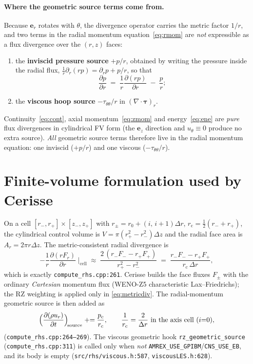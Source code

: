 \documentclass[11pt]{article}
\newcommand{\pd}[2]{\frac{\partial #1}{\partial #2}}
\newcommand{\ur}{u_r}
\newcommand{\rhalf}{r_{\mathrm{c}}}
\newcommand{\code}[1]{\texttt{\small #1}}
\begin{document}
\paragraph{Where the geometric source terms come from.}
Because $\bm e_r$ rotates with $\theta$, the divergence operator carries
the metric factor $1/r$, and two terms in the radial momentum
equation~\eqref{eq:rmom} are \emph{not} expressible as a flux divergence
over the $(r,z)$ faces:
\begin{enumerate}[leftmargin=2.2em,itemsep=2pt]
\item the \textbf{inviscid pressure source} $+p/r$, obtained by writing the
      pressure inside the radial flux,
      $\tfrac1r\partial_r(rp)=\partial_r p + p/r$, so that
      \begin{equation}
      \pd{p}{r} \;=\; \frac1r\pd{(rp)}{r} \;-\; \frac{p}{r};
      \label{eq:psplit}
      \end{equation}
\item the \textbf{viscous hoop source} $-\tau_{\theta\theta}/r$ in
      $(\nabla\cdot\bm\tau)_r$.
\end{enumerate}
Continuity~\eqref{eq:cont}, axial momentum~\eqref{eq:zmom} and
energy~\eqref{eq:ene} are \emph{pure} flux divergences in cylindrical FV
form (the $\bm e_z$ direction and $u_\theta\!\equiv\!0$ produce no extra
source).  \emph{All} geometric source terms therefore live in the radial
momentum equation: one inviscid ($+p/r$) and one viscous
($-\tau_{\theta\theta}/r$).

\section{Finite-volume formulation used by Cerisse}
On a cell $[r_-,r_+]\times[z_-,z_+]$ with $r_\pm=r_0+(i,\,i{+}1)\Delta r$,
$\rhalf=\tfrac12(r_-+r_+)$, the cylindrical control volume is
$V=\pi(r_+^2-r_-^2)\Delta z$ and the radial face area is $A_r=2\pi r\Delta z$.
The metric-consistent radial divergence is
\begin{equation}
-\frac1r\pd{(rF_r)}{r}\;\Big|_{\text{cell}}
   \;\approx\;
   \frac{2\,(r_-F_- - r_+F_+)}{r_+^2-r_-^2}
   \;=\;
   \frac{r_-F_- - r_+F_+}{\rhalf\,\Delta r},
\label{eq:metricdiv}
\end{equation}
which is exactly \code{compute\_rhs.cpp:261}.  Cerisse builds the face
fluxes $F_\pm$ with the ordinary \emph{Cartesian} momentum flux
(WENO-Z5 characteristic Lax--Friedrichs); the RZ weighting is applied only
in \eqref{eq:metricdiv}.  The radial-momentum geometric source is then
added as
\begin{equation}
\Bigl(\pd{(\rho\ur)}{t}\Bigr)_{\!\text{source}} \mathrel{+}= \frac{p_{\mathrm c}}{\rhalf},
\qquad \frac{1}{\rhalf}=\frac{2}{\Delta r}\ \text{in the axis cell }(i{=}0),
\label{eq:psource}
\end{equation}
(\code{compute\_rhs.cpp:264--269}).  The viscous geometric hook
\code{rz\_geometric\_source} (\code{compute\_rhs.cpp:311}) is called only
when \emph{not} \code{AMREX\_USE\_GPIBM}/\code{CNS\_USE\_EB}, and its body is
empty (\code{src/rhs/viscous.h:587}, \code{viscousLES.h:628}).
\end{document}
